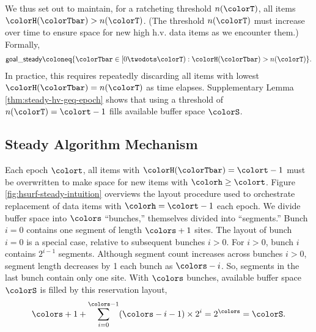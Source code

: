 We thus set out to maintain, for a ratcheting threshold $n(\colorT)$, all items $\colorH(\colorTbar) > n(\colorT)$.
(The threshold $n(\colorT)$ must increase over time to ensure space for new high h.v. data items as we encounter them.)
Formally,
\begin{align*}
\mathsf{goal\_steady}
\coloneq \{
\colorTbar \in [0 \twodots \colorT)
: \colorH(\colorTbar) > n(\colorT)
\}.
\end{align*}
In practice, this requires repeatedly discarding all items with lowest \hv{} $\colorH(\colorTbar) = n(\colorT)$ as time elapses.
Supplementary Lemma \ref{thm:steady-hv-geq-epoch} shows that using a threshold of $n(\colorT) = \colort - 1$ fills available buffer space $\colorS$.%

\subsection{Steady Algorithm Mechanism}
\label{sec:steady-mechanism}



Each epoch $\colort$, all items with $\colorH(\colorTbar) = \colort - 1$ must be overwritten to make space for new items with \hv{} $\colorh \geq \colort$.
Figure \ref{fig:hsurf-steady-intuition} overviews the layout procedure used to orchestrate replacement of data items with \hv{} $\colorh = \colort - 1$ each epoch.
We divide buffer space into $\colors$ ``bunches,'' themselves divided into ``segments.''
Bunch $i=0$ contains one segment of length $\colors + 1$ sites.
The layout of bunch $i=0$ is a special case, relative to subsequent bunches $i>0$.
For $i > 0$, bunch $i$ contains $2^{i-1}$ segments.
Although segment count increases across bunches $i > 0$, segment length decreases by 1 each bunch as $\colors - i$.
So, segments in the last bunch contain only one site.
With $\colors$ bunches, available buffer space $\colorS$ is filled by this reservation layout,
\begin{align*}
\colors + 1 + \sum_{i=0}^{\colors-1} (\colors - i - 1) \times 2^{i} = 2^{\colors} = \colorS.
\end{align*}

